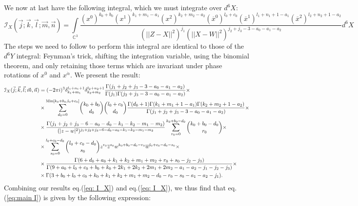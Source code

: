 \documentclass[a4paper,11pt]{article}
\begin{document}
We now at last have the following integral, which we must integrate over $d^6X$:
\begin{equation*}
   \mathcal{I}_X(\vec{j};\vec{k},\vec{l};\vec{m}, \vec{n}) = \underset{\mathbb{C}^3}{\int} \frac{(x^0)^{k_0+b_0} (x^1)^{k_1+m_1-a_1} (x^2)^{k_2+m_2-a_2} (\overline{x}^0)^{l_0+c_0} (\overline{x}^1)^{l_1+n_1+1-a_1} (\overline{x}^2)^{l_2+n_2+1-a_2}}{(\vert \vert Z-X \vert \vert^2)^{j_1} (\vert \vert X-W \vert \vert^2)^{j_2+j_3-3-a_0-a_1-a_2}} d^6X
\end{equation*}
The steps we need to follow to perform this integral are identical to those of the $d^6Y$ integral: Feynman's trick, shifting the integration variable, using the binomial theorem, and only retaining those terms which are invariant under phase rotations of $x^0$ and $x^{\dot{\alpha}}$. We present the result:
\begingroup \allowdisplaybreaks \begin{align}
\mathcal{I}_X(\vec{j};\vec{k},\vec{l};\vec{m}, \vec{n}) &= (-2\pi i)^3 \delta_{k_1+m_1}^{l_1+n_1+1} \delta_{k_2+m_2}^{l_2+n_2+1} \frac{\Gamma(j_1+j_2+j_3-3-a_0-a_1-a_2)}{\Gamma(j_1) \Gamma(j_2+j_3-3-a_0-a_1-a_2)} \times \label{eq: I_X} \\
&\times \overset{\text{Min}[k_0+b_0,l_0+c_0]}{\sum_{d_0=0}} {k_0+b_0 \choose d_0} {l_0+c_0 \choose d_0} \frac{\Gamma(d_0+1) \Gamma(k_1+m_1+1-a_1) \Gamma(k_2+m_2+1-a_2)}{\Gamma(j_1+j_2+j_3-3-a_0-a_1-a_2)} \times \notag \\
&\times \frac{\Gamma(j_1+j_2+j_3-6-a_0-d_0-k_1-k_2-m_1-m_2)}{(\vert z-w \vert^2)^{j_1+j_2+j_3-6-d_0-a_0-k_1-k_2-m_1-m_2}} \sum_{r_0=0}^{k_0+b_0-d_0}  {k_0+b_0-d_0 \choose r_0} \times \notag \\
&\times \sum_{s_0=0}^{l_0+c_0-d_0} {l_0+c_0-d_0 \choose s_0} z^{r_0} \overline{z}^{s_0} w^{k_0+b_0-d_0-r_0} \overline{w}^{l_0+c_0-d_0-s_0} \times \notag \\
&\times \frac{\Gamma(6+d_0+a_0+k_1+k_2+m_1+m_2+r_0+s_0-j_2-j_3)}{\Gamma(9+a_0+l_0+c_0+b_0+k_0+2k_1+2k_2+2m_1+2m_2-a_1-a_2-j_1-j_2-j_3)} \times \notag \\
&\times \Gamma(3+b_0+l_0+c_0+k_0+k_1+k_2+m_1+m_2-d_0-r_0-s_0-a_1-a_2-j_1). \notag
\end{align} \endgroup
Combining our results eq.(\ref{eq: I_X}) and eq.(\ref{eq: I_X}), we thus find that eq.(\ref{eq:main I}) is given by the following expression:
\end{document}
